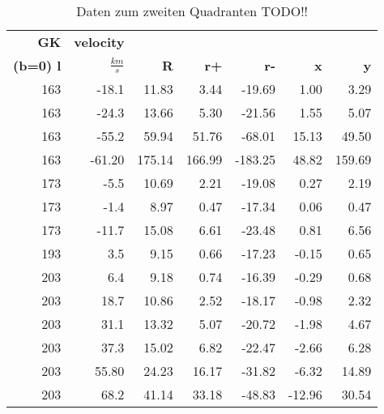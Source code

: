 \begin{table}[H]
    \centering
    \caption{Daten zum zweiten Quadranten TODO!!}
\begin{tabular}{|r|r|r|r|r|r|r|}
    \hline
    {\textbf{GK}} & {\textbf{velocity}} & {} &   {} &   {} &    {} &    {} \\
    {\textbf{(b=0) l}} & {\textbf{ $\si{}{\frac{km}{s}}$}} & {\textbf{R}} &   {\textbf{r+}} &   {\textbf{r-}}&    {\textbf{x}} &    {\textbf{y}} \\
    \hline
           163 &      -18.1 &      11.83 &       3.44 &     -19.69 &       1.00 &       3.29 \\
    
           163 &      -24.3 &      13.66 &       5.30 &     -21.56 &       1.55 &       5.07 \\
    
           163 &      -55.2 &      59.94 &      51.76 &     -68.01 &      15.13 &      49.50 \\
    
           163 &     -61.20 &     175.14 &     166.99 &    -183.25 &      48.82 &     159.69 \\
    \hline
           173 &       -5.5 &      10.69 &       2.21 &     -19.08 &       0.27 &       2.19 \\
    
           173 &       -1.4 &       8.97 &       0.47 &     -17.34 &       0.06 &       0.47 \\
    
           173 &      -11.7 &      15.08 &       6.61 &     -23.48 &       0.81 &       6.56 \\
    \hline
           193 &        3.5 &       9.15 &       0.66 &     -17.23 &      -0.15 &       0.65 \\
    \hline
           203 &        6.4 &       9.18 &       0.74 &     -16.39 &      -0.29 &       0.68 \\
    
           203 &       18.7 &      10.86 &       2.52 &     -18.17 &      -0.98 &       2.32 \\
    
           203 &       31.1 &      13.32 &       5.07 &     -20.72 &      -1.98 &       4.67 \\
    
           203 &       37.3 &      15.02 &       6.82 &     -22.47 &      -2.66 &       6.28 \\
    
           203 &      55.80 &      24.23 &      16.17 &     -31.82 &      -6.32 &      14.89 \\
    
           203 &       68.2 &      41.14 &      33.18 &     -48.83 &     -12.96 &      30.54 \\
    \hline
    \end{tabular} 
    \label{tab: zweiter Quadrant2} 
\end{table}
    

